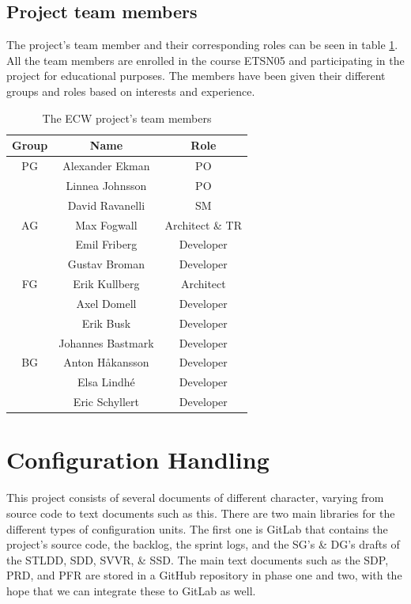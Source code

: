 \documentclass{article}
\begin{document}
\subsection{Project team members}
The project's team member and their corresponding roles can be seen in table \ref{team}. All the team members are enrolled in the course ETSN05 and participating in the project for educational purposes. The members have been given their different groups and roles based on interests and experience. 
\begin{table}[h]
    \centering
    \begin{tabular}{|c|c|c|}
    \hline
        Group & Name & Role \\
        \hline \hline
        PG & Alexander Ekman & PO \\ 
        & Linnea Johnsson & PO \\
        & David Ravanelli & SM \\
        \hline
        AG & Max Fogwall & Architect \& TR \\
        & Emil Friberg & Developer \\
        & Gustav Broman & Developer \\
        \hline
        FG & Erik Kullberg & Architect \\
        & Axel Domell & Developer\\ 
        & Erik Busk & Developer \\
        & Johannes Bastmark & Developer\\
        \hline
        BG & Anton Håkansson & Developer\\
        & Elsa Lindhé & Developer\\
        & Eric Schyllert  & Developer\\
        \hline
    \end{tabular}
    \caption{The ECW project's team members}
    \label{team}
\end{table}

\section{Configuration Handling}
This project consists of several documents of different character, varying from source code to text documents such as this. There are two main libraries for the different types of configuration units. The first one is GitLab that contains the project's source code, the backlog, the sprint logs, and the SG's \& DG's drafts of the STLDD, SDD, SVVR, \& SSD. The main text documents such as the SDP, PRD, and PFR are stored in a GitHub repository in phase one and two, with the hope that we can integrate these to GitLab as well.
\end{document}
